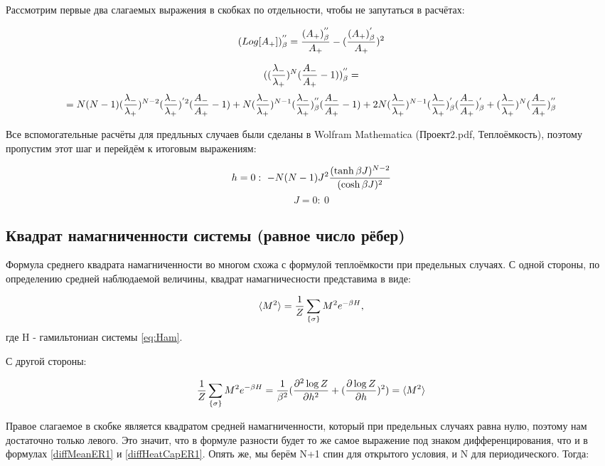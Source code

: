 Рассмотрим первые два слагаемых выражения в скобках по отдельности, чтобы не запутаться в расчётах:

\begin{equation*}
    (Log[A_{+}])^{''}_{\beta} = \frac{(A_{+})^{''}_{\beta}}{A_{+}} - (\frac{(A_{+})^{'}_{\beta}}{A_{+}})^{2}
\end{equation*}

\[ ((\frac{\lambda_{-}}{\lambda_{+}})^{N}(\frac{A_{-}}{A_{+}} - 1))^{''}_{\beta} = \]
\[ = N(N-1)(\frac{\lambda_{-}}{\lambda_{+}})^{N-2}(\frac{\lambda_{-}}{\lambda_{+}})^{'2}(\frac{A_{-}}{A_{+}} - 1) + N(\frac{\lambda_{-}}{\lambda_{+}})^{N-1}(\frac{\lambda_{-}}{\lambda_{+}})^{''}_{\beta}(\frac{A_{-}}{A_{+}} - 1) + 2N(\frac{\lambda_{-}}{\lambda_{+}})^{N-1}(\frac{\lambda_{-}}{\lambda_{+}})^{'}_{\beta}(\frac{A_{-}}{A_{+}})^{'}_{\beta} + (\frac{\lambda_{-}}{\lambda_{+}})^{N}(\frac{A_{-}}{A_{+}})^{''}_{\beta} \]

Все вспомогательные расчёты для предльных случаев были сделаны в Wolfram Mathematica (Проект2.pdf, Теплоёмкость)\cite{web:ProjectMagnetRepos}, поэтому пропустим этот шаг и перейдём к итоговым выражениям:

\[ h = 0:\ -N(N-1)J^{2}\frac{(\tanh{\bj})^{N-2}}{(\cosh{\bj})^{2}} \]
\[ J = 0:\ 0\]

\subsection{Квадрат намагниченности системы (равное число рёбер)}

Формула среднего квадрата намагниченности во многом схожа с формулой теплоёмкости при предельных случаях. С одной стороны, по определению средней наблюдаемой величины, квадрат намагничесности представима в виде:

\begin{equation}
    \langle M^{2} \rangle = \frac{1}{Z} \sum_{\{\sigma\}} M^{2} e^{-\beta H},
\end{equation}
где H - гамильтониан системы \eqref{eq:Ham}.

С другой стороны:

\begin{equation}
    \frac{1}{Z} \sum_{\{\sigma\}} M^{2} e^{-\beta H} = \frac{1}{\beta^{2}}(\frac{\partial^{2} \log{Z}}{\partial h^{2}} + (\frac{\partial \log{Z}}{\partial h})^{2}) = \langle M^{2} \rangle
\end{equation}

Правое слагаемое в скобке является квадратом средней намагниченности, который при предельных случаях равна нулю, поэтому нам достаточно только левого. Это значит, что в формуле разности будет то же самое выражение под знаком дифференцирования, что и в формулах \eqref{diffMeanER1} и \eqref{diffHeatCapER1}. Опять же, мы берём N+1 спин для открытого условия, и N для периодического. Тогда:

